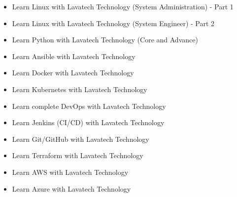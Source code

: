 \setlength{\columnsep}{3pt}
\begin{flushleft}
	
	\begin{itemize}
		\item Learn Linux with Lavatech Technology (System Administration) - Part 1
		\item Learn Linux with Lavatech Technology (System Engineer) - Part 2
		\item Learn Python with Lavatech Technology (Core and Advance)
		\item Learn Ansible with Lavatech Technology
		\item Learn Docker with Lavatech Technology
		\item Learn Kubernetes with Lavatech Technology
		\item Learn complete DevOps with Lavatech Technology
		\item Learn Jenkins (CI/CD) with Lavatech Technology
		\item Learn Git/GitHub with Lavatech Technology
		\item Learn Terraform with Lavatech Technology
		\item Learn AWS with Lavatech Technology
		\item Learn Azure with Lavatech Technology
	\end{itemize}
	
\end{flushleft}

\newpage


